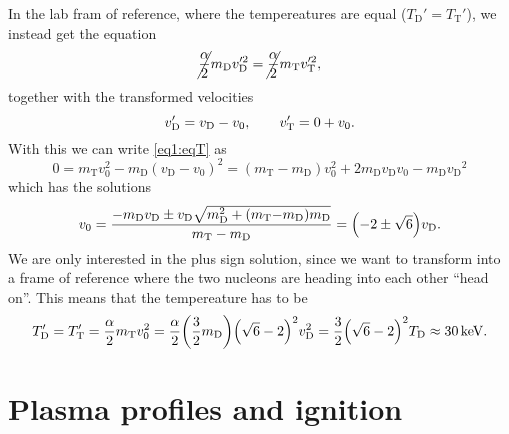 \documentclass[11pt,a4paper, 
swedish, english %
]{article}
\newcommand{\mH}{\ensuremath{m_{\text{H}}}}
\newcommand{\vD}{\ensuremath{v_{\text{D}}}}
\newcommand{\TD}{\ensuremath{T_{\text{D}}}}
\newcommand{\mD}{\ensuremath{m_{\text{D}}}}
\newcommand{\vT}{\ensuremath{v_{\text{T}}}}
\newcommand{\TT}{\ensuremath{T_{\text{T}}}}
\newcommand{\mT}{\ensuremath{m_{\text{T}}}}
\begin{document}
In the lab fram of reference, where the tempereatures are equal
($\TD'=\TT'$), we instead get the equation
\begin{equation}\label{eq1:eqT}
\cancel{\frac{\alpha}{2}}\mD\vD'^2=\cancel{\frac{\alpha}{2}}\mT\vT'^2,
\end{equation}
together with the transformed velocities
\begin{equation}
\vD'=\vD-v_0\qc\quad\vT'=0+v_0.
\end{equation}
With this we can write \eqref{eq1:eqT} as
\begin{equation}
0=\mT v_0^2-\mD(\vD-v_0)^2
=(\mT-\mD)v_0^2 +2\mD\vD v_0 - \mD\vD^2
\end{equation}
which has the solutions
\begin{equation}
v_0=\frac{-\mD\vD\pm
\vD\sqrt{\mD^2+(\mT{-}\mD)\mD}
}{\mT-\mD}
=\qty(-2\pm\sqrt{6})\vD.
\end{equation}
We are only interested in the plus sign solution, since we want to
transform into a frame of reference where the two nucleons are heading
into each other ``head on''. This means that the tempereature has to
be
\begin{equation}
\TD'=\TT'=\frac{\alpha}{2}\mT v_0^2
=\frac{\alpha}{2}\qty(\frac{3}{2}\mD)\qty(\sqrt6-2)^2\vD^2
=\frac{3}{2}\qty(\sqrt6-2)^2 \TD
\approx\unit[30]{keV}.
\end{equation}

\section{Plasma profiles and ignition}






\end{document}
